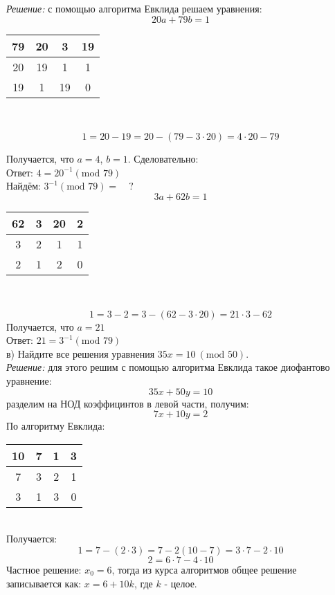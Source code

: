 \documentclass[a4paper,12pt]{article} %
\begin{document}
\textit{Решение:} с помощью алгоритма Евклида решаем уравнения:\\
$$
20a +79b = 1
$$
\begin{center}
\begin{tabular}{|c|c|c|c|}
\hline 
79 & 20 & 3 & 19 \\ 
\hline 
20 & 19 & 1 & 1 \\ 
\hline 
19 & 1 & 19 & 0 \\ 
\hline 
\end{tabular} \\
\end{center}

$$
1 = 20 -19 = 20 - (79 - 3 \cdot 20) = 4 \cdot 20 - 79
$$

Получается, что $ a = 4 $, $ b = 1 $. Сделовательно:\\

Ответ: $ 4 = 20^{-1} (\mbox{mod } 79) $\\

Найдём:  $ 3^{-1} (\mbox{mod } 79) = \quad ? $\\

$$ 3a + 62b = 1 $$
\begin{center}
\begin{tabular}{|c|c|c|c|}
\hline 
62 & 3 & 20 & 2 \\ 
\hline 
3 & 2 & 1 & 1 \\ 
\hline 
2 & 1 & 2 & 0 \\ 
\hline 
\end{tabular} \\
\end{center}
$$
1 = 3 - 2 = 3 - (62 - 3 \cdot 20) = 21 \cdot 3 - 62
$$
Получается, что $ a = 21 $\\

Ответ: $ 21 = 3^{-1} (\mbox{mod } 79) $\\


в) Найдите все решения уравнения $35x = 10 \ (\mbox{mod } 50)$.\\

\textit{Решение:} для этого решим с помощью алгоритма Евклида такое диофантово уравнение:\\
$$
35x + 50y =10
$$
разделим на НОД коэффицинтов в левой части, получим:
$$
7x + 10y = 2
$$
По алгоритму Евклида:
\begin{tabular}{|c|c|c|c|}
\hline 
10 & 7 & 1 & 3 \\ 
\hline 
7 & 3 & 2 & 1 \\ 
\hline 
3 & 1 & 3 & 0 \\ 
\hline 
\end{tabular} \\
Получается:
$$
1 = 7 - (2 \cdot 3) = 7 - 2 \left(10 - 7 \right) = 3 \cdot 7- 2 \cdot 10
$$
$$
2 = 6 \cdot 7 - 4 \cdot 10
$$
Частное решение: $ x_0 = 6 $, тогда из курса алгоритмов общее решение записывается как:
$ x = 6 + 10k$, где $ k $ - целое.\\
\end{document}
